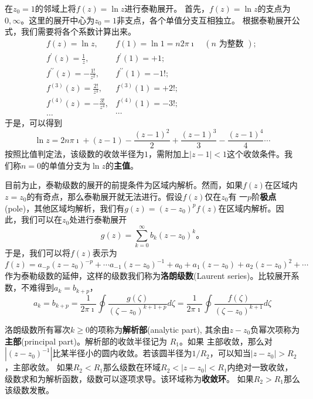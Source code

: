 \begin{examplebox}{在$z_0=1$的邻域上将$f(z) = \ln{z}$进行泰勒展开。}
    首先，$f(z) = \ln z $的支点为$0,\infty$。这里的展开中心为$z_0=1$非支点，各个单值分支互相独立。
    根据泰勒展开公式，我们需要将各个系数计算出来。
    \[
        \begin{array}{ll}
            f(z)=\ln z, & f(1)=\ln 1=n 2 \pi \imath \quad(n \text { 为整数 }) \text {; } \\
            f^{\prime}(z)=\frac{1}{z}, & f^{\prime}(1)=+1 ; \\
            f^{\prime \prime}(z)=-\frac{1 !}{z^2}, & f^{\prime \prime}(1)=-1 ! ; \\
            f^{(3)}(z)=\frac{2 !}{z^3}, & f^{(3)}(1)=+2 ! ; \\
            f^{(4)}(z)=-\frac{3 !}{z^4}, & f^{(4)}(1)=-3 ! ; \\
            \ldots & \cdots
            \end{array}
    \]
    于是，可以得到
    \[
    \ln z = 2 n \pi \imath + (z-1) - \frac{(z-1)^2}{2} +  \frac{(z-1)^3}{3} -  \frac{(z-1)^4}{4} \cdots
    \]
    按照比值判定法，该级数的收敛半径为$1$，需附加上$|z-1|< 1$这个收敛条件。我们称$n=0$的单值分支为$\ln z $的\textbf{主值}。
\end{examplebox}

目前为止，泰勒级数的展开的前提条件为区域内解析。然而，如果$f(z)$在区域内$z=z_0$的有奇点，那么泰勒展开就无法进行。假设$f(z)$仅在$z_0$有
一$p$阶\textbf{极点}(pole)，其他区域均解析，我们有$g(z) = (z-z_0)^p f(z)$在区域内解析。因此，我们可以在$z_0$处进行泰勒展开
\begin{equation}
    g(z) = \sum_{k=0}^{\infty} b_k (z-z_0)^{k} \textrm{。}
\end{equation}
于是，我们可以将$f(z)$表示为
\begin{equation}
    f(z) = a_{-p} (z-z_0)^{-p} + \cdots a_{-1}(z-z_0)^{-1} + a_0 + a_{1} (z-z_0) + a_{2} (z-z_0)^2 + \cdots 
\end{equation}
作为泰勒级数的延伸，这样的级数我们称为\textbf{洛朗级数}(Laurent series)。比较展开系数，不难得到$a_k = b_{k+p}$，
\begin{equation}
    a_k = b_{k+p} = \frac{1}{2\pi \imath} \oint \frac{g(\zeta)}{(\zeta - z_0)^{k+1+p}} d\zeta 
    = \frac{1}{2\pi \imath} \oint \frac{f(\zeta)}{(\zeta - z_0)^{k+1}} d\zeta
\end{equation}

洛朗级数所有幂次$k\geq 0$的项称为\textbf{解析部}(analytic part), 其余由$z-z_0$负幂次项称为\textbf{主部}(principal part)。解析部的收敛半径记为
$R_1$。如果
主部收敛，那么对$|(z-z_0)^{-1}|$比某半径小的圆内收敛。若该圆半径为$1/R_2$，可以知当$|z-z_0|> R_2$，主部收敛。
如果$R_2 < R_1$那么级数在环域$R_2 < |z- z_0| < R_1$内绝对一致收敛，级数求和为解析函数，级数可以逐项求导。该环域称为\textbf{收敛环}。
如果$R_2 > R_1$那么该级数发散。

